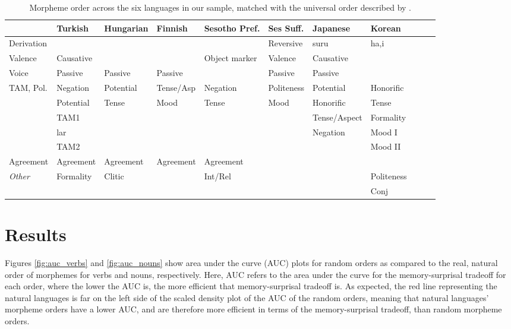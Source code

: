 \documentclass[11pt,letterpaper]{article}
\begin{document}
\begin{table}[]
    \centering
\begin{tabular}{l||l|l|l|l|l|l|llll}
                    & Turkish & Hungarian & Finnish  & Sesotho Pref.     & Ses Suff. & Japanese & Korean\\ \hline\hline
Derivation          &  &         &          &               & Reversive & suru    & ha,i\\ \hline
Valence             &  Causative &         &           & Object marker & Valence & Causative\\ \hline
Voice               & Passive & Passive    & Passive     &               & Passive & Passive\\ \hline
TAM, Pol.           & Negation  &   Potential  &   Tense/Asp &    Negation &  Politeness &      Potential        & Honorific \\
                    & Potential & Tense        &    Mood     &     Tense   &    Mood     &   Honorific  &    Tense       \\
                    &   TAM1    &          &                &         &                  & Tense/Aspect & Formality \\
                    & lar       &          &           &  & & Negation & Mood I\\
                    & TAM2         &           &               &          &       &      &  Mood II \\ \hline
Agreement           & Agreement & Agreement & Agreement & Agreement \\ \hline
\textit{Other}               & Formality          & Clitic    &              & Int/Rel &      &        & Politeness \\
                    &           &     &              &  &          &    & Conj \\
\end{tabular}
    \caption{Morpheme order across the six languages in our sample, matched with the universal order described by \cite{bybee-morphology-1985}.}
    \label{tab:table-orders}
\end{table}





\section{Results}
Figures \ref{fig:auc_verbs} and \ref{fig:auc_nouns} show area under the curve (AUC) plots for random orders as compared to the real, natural order of morphemes for verbs and nouns, respectively. Here, AUC refers to the area under the curve for the memory-surprisal tradeoff for each order, where the lower the AUC is, the more efficient that memory-surprisal tradeoff is. As expected, the red line representing the natural languages is far on the left side of the scaled density plot of the AUC of the random orders, meaning that natural languages' morpheme orders have a lower AUC, and are therefore more efficient in terms of the memory-surprisal tradeoff, than random morpheme orders. 
\end{document}
